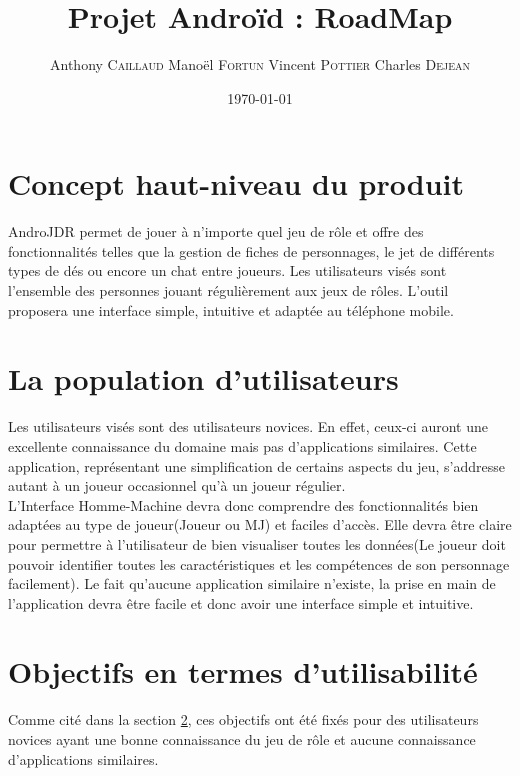 \documentclass[11pt,a4paper]{article}
\title{Projet Androïd : RoadMap}
\author{Anthony \textsc{Caillaud} Manoël \textsc{Fortun} Vincent
\textsc{Pottier} Charles \textsc{Dejean}}
\date{\today}
\begin{document}
\maketitle

\clearpage
\tableofcontents
\clearpage
\section{Concept haut-niveau du produit}

AndroJDR permet de jouer à n'importe quel jeu de rôle et offre des
fonctionnalités telles que la gestion de fiches de personnages, le jet de
différents types de dés ou encore un chat entre joueurs. Les utilisateurs
visés sont l'ensemble des personnes jouant régulièrement aux jeux de rôles.
L'outil proposera une interface simple, intuitive et adaptée au téléphone mobile.

\section{La population d'utilisateurs}
\label{utilisateurs}

Les utilisateurs visés sont des utilisateurs novices. En effet, ceux-ci auront
une excellente connaissance du domaine mais pas d'applications similaires.
Cette application, représentant une simplification de certains aspects du jeu,
s'addresse autant à un joueur occasionnel qu'à un joueur régulier.\\

L'Interface Homme-Machine devra donc comprendre des fonctionnalités bien
adaptées au type de joueur(Joueur ou MJ) et faciles d'accès. Elle devra être
claire pour permettre à l'utilisateur de bien visualiser toutes les données(Le
joueur doit pouvoir identifier toutes les caractéristiques et les compétences de
son personnage facilement). Le fait qu'aucune application similaire n'existe,
la prise en main de l'application devra être facile et donc avoir une interface
simple et intuitive.
	

\section{Objectifs en termes d'utilisabilité}

Comme cité dans la section \ref{utilisateurs}, ces objectifs ont été fixés pour
des utilisateurs novices ayant une bonne connaissance du jeu de rôle et aucune
connaissance d'applications similaires.\\
\end{document}
